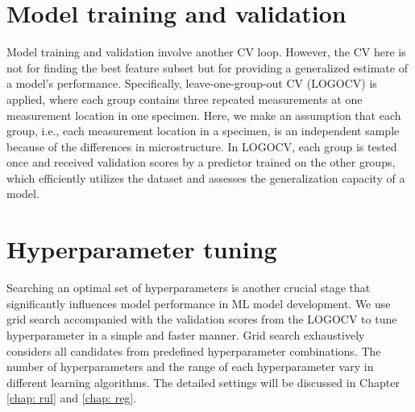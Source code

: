 \section{Model training and validation}
\label{sec: model train and val}
Model training and validation involve another CV loop. However, the CV here is not for finding the best feature subset but for providing a generalized estimate of a model's performance. Specifically, leave-one-group-out CV (LOGOCV) is applied, where each group contains three repeated measurements at one measurement location in one specimen. Here, we make an assumption that each group, i.e., each measurement location in a specimen, is an independent sample because of the differences in microstructure. In LOGOCV, each group is tested once and received validation scores by a predictor trained on the other groups, which efficiently utilizes the dataset and assesses the generalization capacity of a model.

\section{Hyperparameter tuning}
Searching an optimal set of hyperparameters is another crucial stage that significantly influences model performance in ML model development. We use grid search accompanied with the validation scores from the LOGOCV to tune hyperparameter in a simple and faster manner. Grid search exhaustively considers all candidates from predefined hyperparameter combinations. The number of hyperparameters and the range of each hyperparameter vary in different learning algorithms. The detailed settings will be discussed in Chapter \ref{chap: rul} and \ref{chap: reg}.